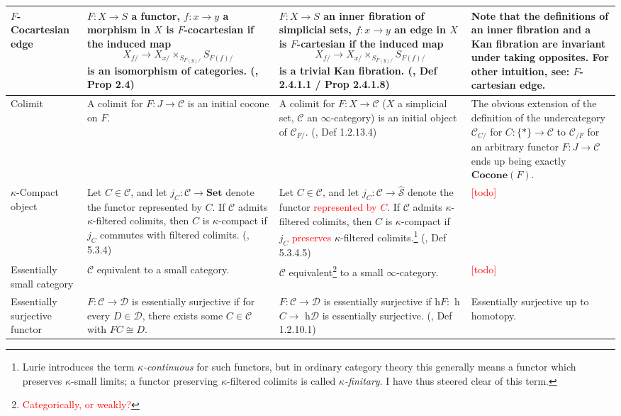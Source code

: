 \documentclass{article}
\def\textcolour{\textcolor}
\begin{document}
\begin{centre}
\begin{longtable}{ |p{3.2cm}||p{5cm}|p{5.2cm}|p{5cm}|  }
 \hline
 \(F\)-Cocartesian edge & \(F : X \to S \) a functor, \(f : x\to y \) a morphism in \(X\) is \(F\)-cocartesian if the induced map \[X_{f/}\to X_{x/}\times_{S_{F(y)/}}S_{F(f)/}\] is an isomorphism of categories. (\autocite{cartesian}, Prop 2.4) & \(F : X \to S \) an inner fibration of simplicial sets, \(f : x\to y \) an edge in \(X\) is \(F\)-cartesian if the induced map \[X_{f/}\to X_{x/}\times_{S_{F(y)/}}S_{F(f)/}\] is a trivial Kan fibration. (\autocite{htt}, Def 2.4.1.1 / Prop 2.4.1.8)& Note that the definitions of an inner fibration and a Kan fibration are invariant under taking opposites. For other intuition, see: \(F\)-cartesian edge. \\
\hline
 Colimit & A colimit for \(F : J \to \mathcal{C}\) is an initial cocone on \(F\). & A colimit for \(F : X\to \mathcal{C} \) (\(X\) a simplicial set, \(\mathcal{C}\) an \(\infty\)-category) is an initial object of \(\mathcal{C}_{F/}\). (\autocite{htt}, Def 1.2.13.4) & The obvious extension of the definition of the undercategory \(\mathcal{C}_{C/}\) for \(C : \{*\} \to \mathcal{C}\) to \(\mathcal{C}_{/F}\)  for an arbitrary functor \(F : J \to \mathcal{C}\) ends up being exactly \(\textbf{Cocone}(F)\). \\
\hline
\(\kappa\)-Compact object & Let \(C \in \mathcal{C}\), and let \(j_C : \mathcal{C} \to \textbf{Set}\) denote the functor represented by \(C\). If \(\mathcal{C}\) admits \(\kappa\)-filtered colimits, then \(C\) is \(\kappa\)-compact if \(j_C\) commutes with filtered colimits. (\autocite{htt}, 5.3.4) & Let \(C \in \mathcal{C}\), and let \(j_C : \mathcal{C} \to \hat{\mathcal{S}}\) denote the functor  \textcolour{red}{represented by \(C\)}. If \(\mathcal{C}\) admits \(\kappa\)-filtered colimits, then \(C\) is \(\kappa\)-compact if \(j_C\)  \textcolour{red}{preserves} \(\kappa\)-filtered colimits.\footnote{Lurie introduces the term \textit{\(\kappa\)-continuous} for such functors, but in ordinary category theory this generally means a functor which preserves \(\kappa\)-small limits; a functor preserving \(\kappa\)-filtered colimits is called \textit{\(\kappa\)-finitary}. I have thus steered clear of this term.} (\autocite{htt}, Def 5.3.4.5) & \textcolour{red}{[todo]}\\
\hline
Essentially small category & \(\mathcal{C}\) equivalent to a small category. & \(\mathcal{C}\) equivalent\footnote{\textcolour{red}{Categorically, or weakly?}} to a small \(\infty\)-category. & \textcolour{red}{[todo]}\\
\hline 
Essentially surjective functor & \(F : \mathcal{C} \to \mathcal{D}\) is essentially surjective if for every \(D \in \mathcal{D}\), there exists some \(C \in \mathcal{C}\) with \(FC \cong D\). & \(F : \mathcal{C} \to \mathcal{D}\) is essentially surjective if h\(F :\) h\(C \to\) h\(\mathcal{D}\) is essentially surjective. (\autocite{htt}, Def 1.2.10.1) & Essentially surjective up to homotopy.\\

\end{longtable}
\end{centre}
\end{document}
